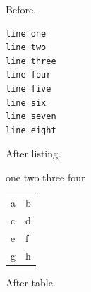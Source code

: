 \documentclass{article}
\begin{document}
Before.
\begin{lstlisting}
line one
line two
line three
line four
line five
line six
line seven
line eight
\end{lstlisting}
After listing.
\begin{algorithmic}
\STATE one
\STATE two
\STATE three
\STATE four
\end{algorithmic}
\begin{longtable}{ll}
a & b \\
c & d \\
e & f \\
g & h \\
\end{longtable}
After table.
\end{document}
